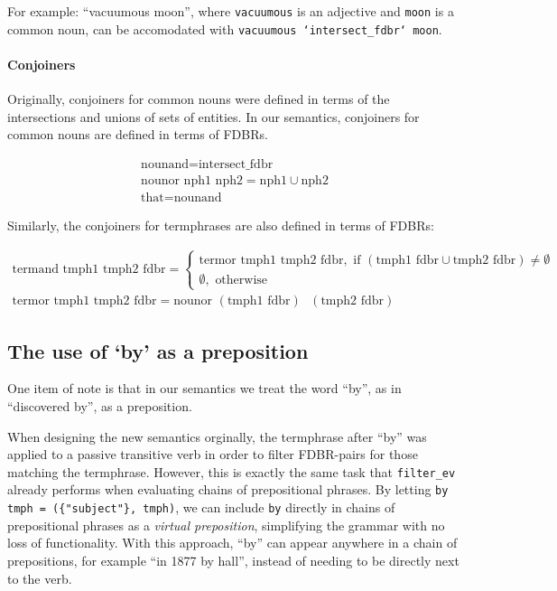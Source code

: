 \documentclass[../main.tex]{subfiles}
\begin{document}
For example: ``vacuumous moon'', where \texttt{vacuumous} is an adjective
and \texttt{moon} is a common noun, can be accomodated with
\texttt{vacuumous `intersect\_fdbr` moon}.


\paragraph{Conjoiners}

Originally, conjoiners for common nouns were defined in terms of the intersections and unions
of sets of entities.  In our semantics, conjoiners for common nouns are defined in terms
of FDBRs.

\begin{gather*}
    \text{nounand} = \text{intersect\_fdbr} \\
    \text{nounor nph1 nph2} = \text{nph1} \cup \text{nph2} \\
    \text{that} = \text{nounand}
\end{gather*}

Similarly, the conjoiners for termphrases are also defined in terms of FDBRs:

\begin{gather*}
  \text{termand tmph1 tmph2 fdbr} =
  \begin{cases}
    \text{termor tmph1 tmph2 fdbr},\text{ if } \left(\text{tmph1 fdbr} \cup
    \text{tmph2 fdbr}\right) \neq \emptyset \\
    \emptyset,\text{ otherwise }
  \end{cases} \\
  \text{termor tmph1 tmph2 fdbr} = \text{nounor } (\text{tmph1 fdbr}) \text{ }
  (\text{tmph2 fdbr})
\end{gather*}

\subsection{The use of `by' as a preposition}

One item of note is that in our semantics we treat the word ``by'', as in ``discovered by'', as a preposition.

When designing the new semantics orginally, the termphrase after ``by'' was
applied to a passive transitive verb in order to filter FDBR-pairs for those matching
the termphrase.  However, this is exactly the same task that \texttt{filter\_ev} already performs when evaluating chains of prepositional phrases.
By letting \texttt{by tmph = (\{"subject"\}, tmph)}, we can include \texttt{by}
directly in chains of prepositional phrases as a {\em virtual preposition}, simplifying the grammar
with no loss of functionality.  With this approach, ``by'' can appear anywhere in a chain of prepositions, for example ``in 1877 by hall'', instead
of needing to be directly next to the verb.
\end{document}
